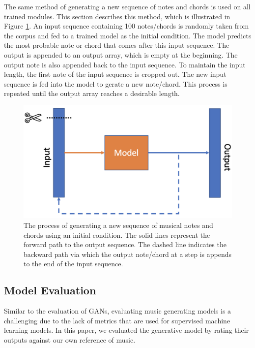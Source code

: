 \documentclass[sigconf,authorversion]{acmart}
\begin{document}
The same method of generating a new sequence of notes and chords is used on all trained
modules. This section describes this method, which is illustrated in Figure \ref{generate_music}. 
An input sequence containing 100 notes/chords is randomly taken from the corpus and
fed to a trained model as the initial condition. The model predicts the most probable note
or chord that comes after this input sequence. The output is appended to an output array, which is
empty at the beginning. The output note is also appended back to the input sequence. To maintain 
the input length, the first note of the input sequence is cropped out. The new input sequence
is fed into the model to gerate a new note/chord. This process is repeated until the output
array reaches a desirable length.

\begin{figure}[h]
  \centering
  \includegraphics[width=\linewidth]{generate_music.png}
  \caption{The process of generating a new sequence of musical notes and chords 
  using an initial condition. The solid lines represent the forward path to the output
  sequence. The dashed line indicates the backward path via which the output note/chord at
  a step is appends to the end of the input sequence.}
  \label{generate_music}
\end{figure}

\subsection{Model Evaluation}

Similar to the evaluation of GANs, evaluating music generating models is a challenging 
due to the lack of metrics that are used for supervised machine learning models.
In this paper, we evaluated the generative model by rating their outputs against our own
reference of music.
\end{document}
